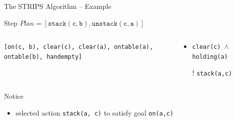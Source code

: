 \documentclass[presentation]{beamer}\mode<presentation>{\usetheme{AMSBolognaFC}}
\begin{document}

% 			



\begin{frame}[c]{The STRIPS Algorithm -- Example}
\small

\begin{exampleblock}{Step \nextStripsExampleStep{} \hfill $Plan = [\mathtt{stack(c,b),unstack(c,a)}]$}
	\begin{columns}[t]
		\begin{column}{.30\linewidth}\centering
			\texttt{[on(c, b), clear(c), clear(a), ontable(a), ontable(b), handempty]}
		\end{column}
		\begin{column}{.50\linewidth}\centering
			\begin{itemize}
				\item \texttt{clear(c) $\wedge$ holding(a)}
				\item[!] \texttt{stack(a,c)}
			\end{itemize}
		\end{column}
		\begin{column}{.10\linewidth}\centering
			
		\end{column}
	\end{columns}
\end{exampleblock}

\vfill

\footnotesize
Notice
\begin{itemize}\tiny
    \item selected action \texttt{stack(a, c)} to satisfy goal \texttt{on(a,c)}
\end{itemize}

\end{frame}
\end{document}
